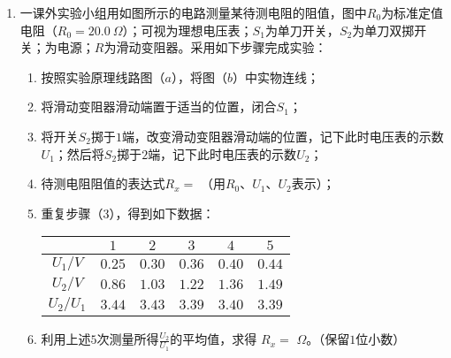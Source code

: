 \begin{enumerate}[leftmargin=0em]
\begin{enumerate}
\end{enumerate}


\item 
{}
一课外实验小组用如图所示的电路测量某待测电阻的阻值，图中$ R_{0} $为标准定值电阻（$R _ { 0 } = 20.0 \ \Omega$）；可视为理想电压表；$ S_{1} $为单刀开关，$ S_{2} $为单刀双掷开关；为电源；$ R $为滑动变阻器。采用如下步骤完成实验：
\begin{figure}[h!]
\centering

\end{figure}


\begin{enumerate}
\renewcommand{\labelenumi}{\arabic{enumi}.}
\item
按照实验原理线路图（$ a $），将图（$ b $）中实物连线；
\item 
将滑动变阻器滑动端置于适当的位置，闭合$ S_{1} $；
\item 
将开关$ S_{2} $掷于$ 1 $端，改变滑动变阻器滑动端的位置，记下此时电压表的示数$ U_{1} $；然后将$ S_{2} $掷于$ 2 $端，记下此时电压表的示数$ U_{2} $；
\item 
待测电阻阻值的表达式$ R_{x}= $
（用$ R_{0} $、$ U_{1} $、$ U_{2} $表示）；
\item 
重复步骤（$ 3 $），得到如下数据：

\begin{table}[h!]
\centering 
\begin{tabular}{|c|c|c|c|c|c|}
\hline 
& $ 1 $ & $ 2 $ & $ 3 $ & $ 4 $ & $ 5 $
 \\
\hline
$ U_{1} /V $ & $ 0.25 $ & $ 0.30 $ & $ 0.36 $ & $ 0.40 $ & $ 0.44 $
 \\
\hline
$ U_{2} /V $ & $ 0.86 $ & $ 1.03 $ & $ 1.22 $ & $ 1.36 $ & $ 1.49 $
 \\
\hline
$ U_{2} / U_{1} $ & $ 3.44 $ & $ 3.43 $ & $ 3.39 $ & $ 3.40 $ & $ 3.39 $\\ 
\hline 
\end{tabular}
\end{table} 


\item 
利用上述$ 5 $次测量所得$\frac { U _ { 2 } } { U _ { 1 } }$的平均值，求得 $ R_{x}= $  $ \Omega $。（保留$ 1 $位小数）




\end{enumerate}
\end{enumerate}
